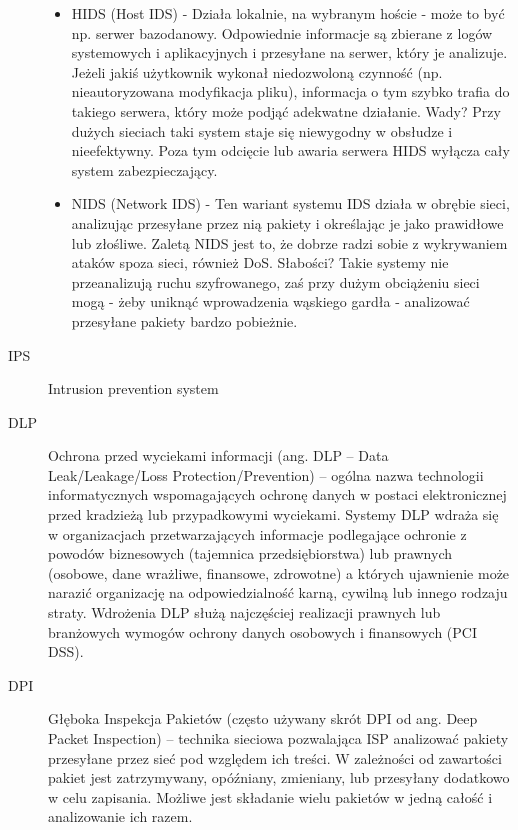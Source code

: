 \documentclass[answers,11pt]{exam}
\begin{document}
\begin{questions}
\begin{solution}
\begin{description}
\begin{itemize}
\item{HIDS (Host IDS)} - Działa lokalnie, na wybranym hoście - może to być np. serwer bazodanowy. Odpowiednie informacje są zbierane z logów systemowych i aplikacyjnych i przesyłane na serwer, który je analizuje. Jeżeli jakiś użytkownik wykonał niedozwoloną czynność (np. nieautoryzowana modyfikacja pliku), informacja o tym szybko trafia do takiego serwera, który może podjąć adekwatne działanie.
Wady? Przy dużych sieciach taki system staje się niewygodny w obsłudze i nieefektywny. Poza tym odcięcie lub awaria serwera HIDS wyłącza cały system zabezpieczający.
\item{NIDS (Network IDS)} - Ten wariant systemu IDS działa w obrębie sieci, analizując przesyłane przez nią pakiety i określając je jako prawidłowe lub złośliwe. Zaletą NIDS jest to, że dobrze radzi sobie z wykrywaniem ataków spoza sieci, również DoS.
Słabości? Takie systemy nie przeanalizują ruchu szyfrowanego, zaś przy dużym obciążeniu sieci mogą - żeby uniknąć wprowadzenia wąskiego gardła - analizować przesyłane pakiety bardzo pobieżnie.
\end{itemize}
\item[IPS]
Intrusion prevention system
\item[DLP]
Ochrona przed wyciekami informacji (ang. DLP – Data Leak/Leakage/Loss Protection/Prevention) – ogólna nazwa technologii informatycznych wspomagających ochronę danych w postaci elektronicznej przed kradzieżą lub przypadkowymi wyciekami.
Systemy DLP wdraża się w organizacjach przetwarzających informacje podlegające ochronie z powodów biznesowych (tajemnica przedsiębiorstwa) lub prawnych (osobowe, dane wrażliwe, finansowe, zdrowotne) a których ujawnienie może narazić organizację na odpowiedzialność karną, cywilną lub innego rodzaju straty. Wdrożenia DLP służą najczęściej realizacji prawnych lub branżowych wymogów ochrony danych osobowych i finansowych (PCI DSS).
\item[DPI]
Głęboka Inspekcja Pakietów (często używany skrót DPI od ang. Deep Packet Inspection) – technika sieciowa pozwalająca ISP analizować pakiety przesyłane przez sieć pod względem ich treści. W zależności od zawartości pakiet jest zatrzymywany, opóźniany, zmieniany, lub przesyłany dodatkowo w celu zapisania. Możliwe jest składanie wielu pakietów w jedną całość i analizowanie ich razem.
\end{description}
\end{solution}
\end{questions}
\end{document}
